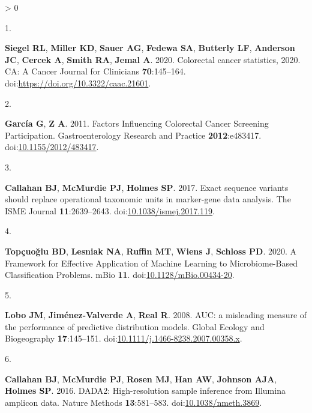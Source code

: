 \documentclass[
]{article}
\newlength{\cslhangindent}
\newlength{\csllabelwidth}
\newenvironment{CSLReferences}[2] %
 {%
  \setlength{\parindent}{0pt}
  \ifodd #1 \everypar{\setlength{\hangindent}{\cslhangindent}}\ignorespaces\fi
  \ifnum #2 > 0
  \setlength{\parskip}{#2\baselineskip}
  \fi
 }%
 {}
\newcommand{\CSLLeftMargin}[1]{\parbox[t]{\csllabelwidth}{#1}}
\newcommand{\CSLRightInline}[1]{\parbox[t]{\linewidth - \csllabelwidth}{#1}\break}
\begin{document}
\hypertarget{refs}{}
\begin{CSLReferences}{0}{1}
\leavevmode\hypertarget{ref-siegel2020}{}%
\CSLLeftMargin{1. }
\CSLRightInline{\textbf{Siegel RL}, \textbf{Miller KD}, \textbf{Sauer
AG}, \textbf{Fedewa SA}, \textbf{Butterly LF}, \textbf{Anderson JC},
\textbf{Cercek A}, \textbf{Smith RA}, \textbf{Jemal A}. 2020. Colorectal
cancer statistics, 2020. CA: A Cancer Journal for Clinicians
\textbf{70}:145--164. doi:\url{https://doi.org/10.3322/caac.21601}.}

\leavevmode\hypertarget{ref-garcuxeda2011a}{}%
\CSLLeftMargin{2. }
\CSLRightInline{\textbf{García G}, \textbf{Z A}. 2011. Factors
Influencing Colorectal Cancer Screening Participation. Gastroenterology
Research and Practice \textbf{2012}:e483417.
doi:\href{https://doi.org/10.1155/2012/483417}{10.1155/2012/483417}.}

\leavevmode\hypertarget{ref-callahan2017}{}%
\CSLLeftMargin{3. }
\CSLRightInline{\textbf{Callahan BJ}, \textbf{McMurdie PJ},
\textbf{Holmes SP}. 2017. Exact sequence variants should replace
operational taxonomic units in marker-gene data analysis. The ISME
Journal \textbf{11}:2639--2643.
doi:\href{https://doi.org/10.1038/ismej.2017.119}{10.1038/ismej.2017.119}.}

\leavevmode\hypertarget{ref-topuxe7uolu2020}{}%
\CSLLeftMargin{4. }
\CSLRightInline{\textbf{Topçuoğlu BD}, \textbf{Lesniak NA},
\textbf{Ruffin MT}, \textbf{Wiens J}, \textbf{Schloss PD}. 2020. A
Framework for Effective Application of Machine Learning to
Microbiome-Based Classification Problems. mBio \textbf{11}.
doi:\href{https://doi.org/10.1128/mBio.00434-20}{10.1128/mBio.00434-20}.}

\leavevmode\hypertarget{ref-lobo2008}{}%
\CSLLeftMargin{5. }
\CSLRightInline{\textbf{Lobo JM}, \textbf{Jiménez-Valverde A},
\textbf{Real R}. 2008. AUC: a misleading measure of the performance of
predictive distribution models. Global Ecology and Biogeography
\textbf{17}:145--151.
doi:\href{https://doi.org/10.1111/j.1466-8238.2007.00358.x}{10.1111/j.1466-8238.2007.00358.x}.}

\leavevmode\hypertarget{ref-callahan2016}{}%
\CSLLeftMargin{6. }
\CSLRightInline{\textbf{Callahan BJ}, \textbf{McMurdie PJ},
\textbf{Rosen MJ}, \textbf{Han AW}, \textbf{Johnson AJA}, \textbf{Holmes
SP}. 2016. DADA2: High-resolution sample inference from Illumina
amplicon data. Nature Methods \textbf{13}:581--583.
doi:\href{https://doi.org/10.1038/nmeth.3869}{10.1038/nmeth.3869}.}

\end{CSLReferences}
\end{document}
